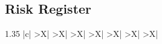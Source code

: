 \documentclass[11pt]{article}
\begin{document}
\begin{landscape}
\section{Risk Register}
\small
\begin{xltabular}{1.35\linewidth}{
    |c|
    >{\hsize}X|
    >{\hsize}X|
    >{\hsize}X|
    >{\hsize}X|   
    >{\hsize}X|
    >{\hsize}X|
    >{\hsize}X|
}
\hline


\end{xltabular}
\end{landscape}
\end{document}

